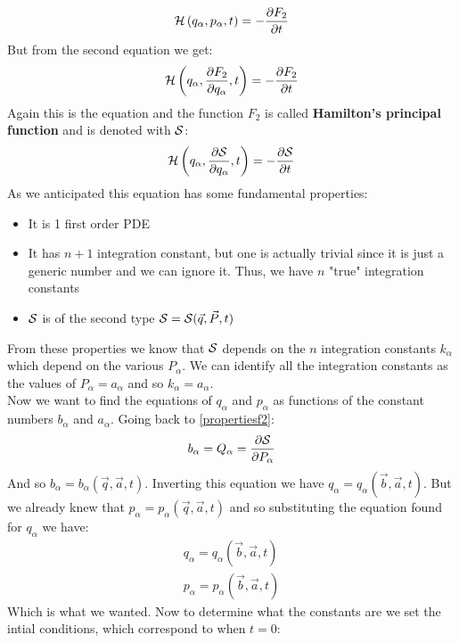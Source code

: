 \begin{equation}
  \hamfun \brackets{q_{\alpha}, p_{\alpha},t}= -\pdv{F_2}{t}
\end{equation}
But from the second equation we get:
\begin{equation}
  \hamfun \brackets{q_{\alpha}, \pdv{F_2}{q_{\alpha}},t}= -\pdv{F_2}{t}
\end{equation}
Again this is the \hamjacref\;equation and the function $F_2$ is called \textbf{Hamilton's principal function} and is denoted with $\mathcal{S}$:
\begin{equation}
  \hamfun \brackets{q_{\alpha}, \pdv{\action}{q_{\alpha}},t}= -\pdv{\action}{t}
\end{equation}
As we anticipated this equation has some fundamental properties:
\begin{itemize}
  \item It is 1 first order PDE
  \item It has $n+1$ integration constant, but one is actually trivial since it is just a generic number and we can ignore it. Thus, we have $n$ "true" integration constants
  \item $\mathcal{S}$ is of the second type $\mathcal{S} = \mathcal{S}(\vec{q},\vec{P},t)$
\end{itemize}
From these properties we know that $\mathcal{S}$ depends on the $n$ integration constants $k_{\alpha}$ which depend on the various $P_{\alpha}$. We can identify all the integration constants as the values of $P_{\alpha} = a_{\alpha}$ and so $k_{\alpha} = a_{\alpha}$.\\
Now we want to find the equations of $q_{\alpha}$ and $p_{\alpha}$ as functions of the constant numbers $b_{\alpha}$ and $a_{\alpha}$. Going back to \eqref{propertiesf2}:
\begin{equation}
  b_{\alpha} = Q_{\alpha} = \pdv{\action}{P_{\alpha}}
\end{equation}
And so $b_{\alpha} = b_{\alpha}(\vec{q},\vec{a},t)$. Inverting this equation we have $q_{\alpha} = q_{\alpha}(\vec{b},\vec{a},t)$. But we already knew that $p_{\alpha} = p_{\alpha}(\vec{q},\vec{a},t)$ and so substituting the equation found for $q_{\alpha}$ we have:
\begin{equation}
  \begin{split}
    q_{\alpha} = q_{\alpha}(\vec{b},\vec{a},t)\\[8pt]
    p_{\alpha} = p_{\alpha}(\vec{b},\vec{a},t)
  \end{split}
\end{equation}
Which is what we wanted. Now to determine what the constants are we set the intial conditions, which correspond to when $t=0$:
